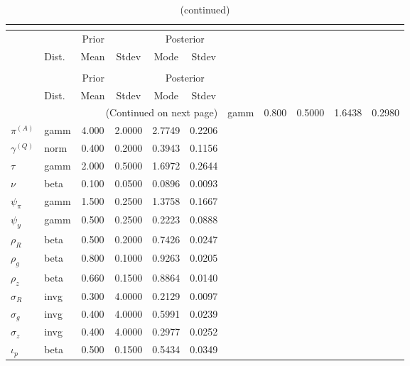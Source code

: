  
\begin{center}
\begin{longtable}{llcccc} 
\caption{Results from posterior maximization (parameters)}\\
 \label{Table:Posterior:1}\\
\toprule 
  & \multicolumn{3}{c}{Prior}  &  \multicolumn{2}{c}{Posterior} \\
  \cmidrule(r{.75em}){2-4} \cmidrule(r{.75em}){5-6}
  & Dist. & Mean  & Stdev & Mode & Stdev \\ 
\midrule \endfirsthead 
\caption{(continued)}\\
 \bottomrule 
  & \multicolumn{3}{c}{Prior}  &  \multicolumn{2}{c}{Posterior} \\
  \cmidrule(r{.75em}){2-4} \cmidrule(r{.75em}){5-6}
  & Dist. & Mean  & Stdev & Mode & Stdev \\ 
\midrule \endhead 
\bottomrule \multicolumn{6}{r}{(Continued on next page)}\endfoot 
\bottomrule\endlastfoot 
${r_{A}}$ & gamm &   0.800 & 0.5000 &   1.6438 &  0.2980 \\ 
${\pi^{(A)}}$ & gamm &   4.000 & 2.0000 &   2.7749 &  0.2206 \\ 
${\gamma^{(Q)}}$ & norm &   0.400 & 0.2000 &   0.3943 &  0.1156 \\ 
${\tau}$ & gamm &   2.000 & 0.5000 &   1.6972 &  0.2644 \\ 
${\nu}$ & beta &   0.100 & 0.0500 &   0.0896 &  0.0093 \\ 
${\psi_\pi}$ & gamm &   1.500 & 0.2500 &   1.3758 &  0.1667 \\ 
${\psi_y}$ & gamm &   0.500 & 0.2500 &   0.2223 &  0.0888 \\ 
${\rho_R}$ & beta &   0.500 & 0.2000 &   0.7426 &  0.0247 \\ 
${\rho_{g}}$ & beta &   0.800 & 0.1000 &   0.9263 &  0.0205 \\ 
${\rho_z}$ & beta &   0.660 & 0.1500 &   0.8864 &  0.0140 \\ 
${\sigma_R}$ & invg &   0.300 & 4.0000 &   0.2129 &  0.0097 \\ 
${\sigma_{g}}$ & invg &   0.400 & 4.0000 &   0.5991 &  0.0239 \\ 
${\sigma_z}$ & invg &   0.400 & 4.0000 &   0.2977 &  0.0252 \\ 
${\iota_p}$ & beta &   0.500 & 0.1500 &   0.5434 &  0.0349 \\ 
\end{longtable}
 \end{center}

